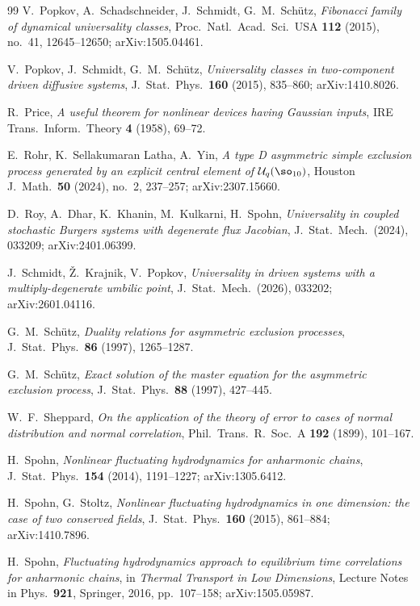 \begin{thebibliography}{99}
 V.~Popkov, A.~Schadschneider, J.~Schmidt, G.~M.~Sch\"utz,
\emph{Fibonacci family of dynamical universality classes},
Proc.~Natl.~Acad.~Sci.~USA \textbf{112} (2015), no.~41, 12645--12650; arXiv:1505.04461.

 V.~Popkov, J.~Schmidt, G.~M.~Sch\"utz, \emph{Universality classes in
two-component driven diffusive systems}, J.~Stat.~Phys.~\textbf{160} (2015),
835--860; arXiv:1410.8026.

 R.~Price, \emph{A useful theorem for nonlinear devices having Gaussian
inputs}, IRE Trans.~Inform.~Theory \textbf{4} (1958), 69--72.

 E.~Rohr, K.~Sellakumaran Latha, A.~Yin, \emph{A type D asymmetric simple
exclusion process generated by an explicit central element of
$\mathcal U_q(\so_{10})$}, Houston J.~Math.~\textbf{50} (2024), no.~2, 237--257;
arXiv:2307.15660.

 D.~Roy, A.~Dhar, K.~Khanin, M.~Kulkarni, H.~Spohn, \emph{Universality
in coupled stochastic Burgers systems with degenerate flux Jacobian},
J.~Stat.~Mech.~(2024), 033209; arXiv:2401.06399.

 J.~Schmidt, \v Z.~Krajnik, V.~Popkov, \emph{Universality in driven
systems with a multiply-degenerate umbilic point}, J.~Stat.~Mech.~(2026), 033202;
arXiv:2601.04116.

 G.~M.~Sch\"utz, \emph{Duality relations for asymmetric exclusion
processes}, J.~Stat.~Phys.~\textbf{86} (1997), 1265--1287.

 G.~M.~Sch\"utz, \emph{Exact solution of the master equation for the
asymmetric exclusion process}, J.~Stat.~Phys.~\textbf{88} (1997), 427--445.

 W.~F.~Sheppard, \emph{On the application of the theory of error to cases
of normal distribution and normal correlation}, Phil.~Trans.~R.~Soc.~A \textbf{192}
(1899), 101--167.

 H.~Spohn, \emph{Nonlinear fluctuating hydrodynamics for
anharmonic chains}, J.~Stat.~Phys.~\textbf{154} (2014), 1191--1227; arXiv:1305.6412.

 H.~Spohn, G.~Stoltz, \emph{Nonlinear fluctuating
hydrodynamics in one dimension: the case of two conserved fields},
J.~Stat.~Phys.~\textbf{160} (2015), 861--884; arXiv:1410.7896.

 H.~Spohn, \emph{Fluctuating hydrodynamics approach to
equilibrium time correlations for anharmonic chains}, in \emph{Thermal Transport
in Low Dimensions}, Lecture Notes in Phys.~\textbf{921}, Springer, 2016,
pp.~107--158; arXiv:1505.05987.


\end{thebibliography}
